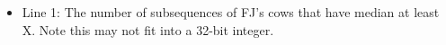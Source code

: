\begin{itemize}
	\item      Line 1: The number of subsequences of FJ's cows that have median at         least X. Note this may not fit into a 32-bit integer.    
\end{itemize}

\